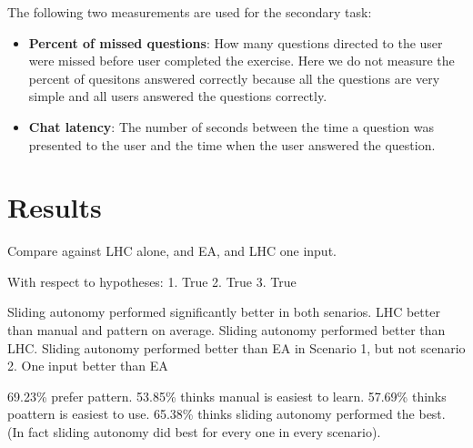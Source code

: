 \documentclass[journal]{IEEEtran}
\begin{document}
The following two measurements are used for the secondary task:
\begin{itemize}
\item \textbf{Percent of missed questions}: How many questions directed to the user were missed before user completed the exercise. Here we do not measure the percent of quesitons answered correctly because all the questions are very simple and all users answered the questions correctly.
\item \textbf{Chat latency}: The number of seconds between the time a question was presented to the user and the time when the user answered the question.
\end{itemize}

\section{Results} 
\label{sec:Results}


Compare against LHC alone, and EA, and LHC one input.



With respect to hypotheses:
1. True
2. True
3. True

Sliding autonomy performed significantly better in both senarios.
LHC better than manual and pattern on average.
Sliding autonomy performed better than LHC.
Sliding autonomy performed better than EA in Scenario 1, but not scenario 2.
One input better than EA




69.23\% prefer pattern.
53.85\% thinks manual is easiest to learn. 
57.69\% thinks poattern is easiest to use.
65.38\% thinks sliding autonomy performed the best. (In fact sliding autonomy did best for every one in every scenario).
\end{document}
